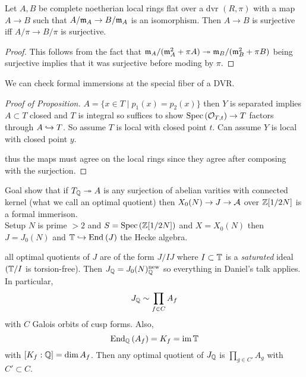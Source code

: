 \documentclass[12pt]{article}
\begin{document}
\begin{lemma}
Let $A, B$ be complete noetherian local rings flat over a dvr $(R, \pi)$ with a map $A \to B$ such that $A /\m_A \to B / \m_A$ is an isomorphism. Then $A \to B$ is surjective iff $A / \pi \to B / \pi$ is surjective.
\end{lemma}

\begin{proof}
This follows from the fact that $\m_A / (\m_A^2 + \pi A) \onto \m_B / (\m_B^2 + \pi B)$ being surjective implies that it was surjective before moding by $\pi$.
\end{proof}

\begin{cor}
We can check formal immersions at the special fiber of a DVR. 
\end{cor}

\begin{proof}[Proof of Proposition]
$A = \{ x \in T  \mid p_1(x) = p_2(x) \}$ then $Y$ is separated implies $A \subset T$ closed and $T$ is integral so suffices to show $\Spec{\stalk{T}{t}} \to T$ factors through $A \embed T$. So assume $T$ is local with closed point $t$. Can assume $Y$ is local with closed point $y$. 
\begin{center}
\end{center}
thus the maps must agree on the local rings since they agree after composing with the surjection. 
\end{proof}

Goal show that if $T_\Q \onto A$ is any surjection of abelian varities with connected kernel (what we call an optimal quotient) then $X_0(N) \to J \to \cA$ over $\Z[1/2N]$ is a formal immerison. 
\bigskip\\
Setup $N$ is prime $ >2$ and $S = \Spec{\Z[1/2N]}$ and $X = X_0(N)$ then $J = J_0(N)$ and $\TT \embed \End{J}$ the Hecke algebra. 

\begin{rmk}
all optimal quotients of $J$ are of the form $J / IJ$ where $I \sub \TT$ is a \textit{saturated} ideal $(\TT / I$ is torsion-free). Then $J_\Q = J_0(N)^{\text{new}}_{\Q}$ so everything in Daniel's talk applies. In particular,
\[ J_{\Q} \sim \prod_{f \in C} A_f \]
with $C$ Galois orbits of cusp forms. Also,
\[ \End[\Q]{A_f} = K_f = \im{\TT} \]
with $[ K_f : \Q ] = \dim{A_f}$. Then any optimal quotient of $J_{\Q}$ is $\prod_{g \in C'} A_g$ with $C' \subset C$. 
\end{rmk}
\end{document}
